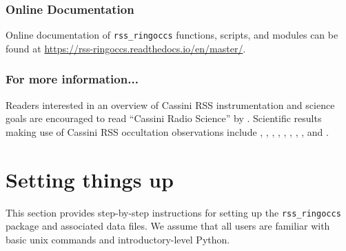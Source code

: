 \documentclass[titlepage, 12pt]{article}
\begin{document}
            \subsubsection{Online Documentation}
            Online documentation of \texttt{rss\_ringoccs} functions, scripts, and modules can be found at \url{https://rss-ringoccs.readthedocs.io/en/master/}.
            \subsubsection{For more information...}
                Readers interested in an overview of Cassini RSS
                instrumentation and science goals are encouraged
                to read ``Cassini Radio Science'' by
                \citealt{Kliore2004}.
                Scientific results making use of
                Cassini RSS occultation observations include
                \citealp{Colwell2009},
                \citealp{ElMoutamid2016},
                \citealp{French2016a},
                \citealp{French2016b},
                \citealp{French2017}
                \citealp{Marouf2011},
                \citealp{Nicholson2014a},
                \citealp{Nicholson2014b},
                \citealp{Rappaport2009},
                and
                \citealp{Thomson2007}.
    \section{Setting things up}
        This section provides step-by-step
        instructions for setting up the \texttt{rss\_ringoccs}
        package and associated data files. We assume
        that all users are familiar with basic unix commands
        and introductory-level Python.
\end{document}
